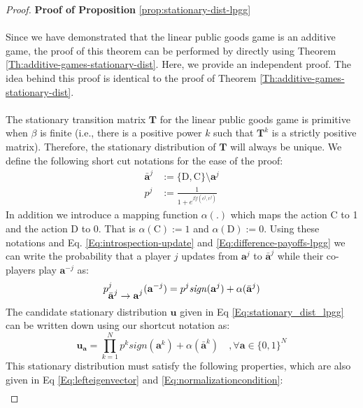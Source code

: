 \documentclass[11pt]{article}
\theoremstyle{plainCl1}
\theoremstyle{plainCl2}
\newcommand{\abf}{\mathbf{a}}
\newcommand{\T}{\mathbf{T}}
\newcommand{\ubf}{\mathbf{u}}
\newcommand{\C}{\mathrm{C}}
\newcommand{\D}{\mathrm{D}}
\begin{document}
\begin{proof}
\textbf{Proof of Proposition} \ref{prop:stationary-dist-lpgg} \\ \\
Since we have demonstrated that the linear public goods game is an additive game, the proof of this theorem can be performed by directly using Theorem \ref{Th:additive-games-stationary-dist}. Here, we provide an independent proof. The idea behind this proof is identical to the proof of Theorem \ref{Th:additive-games-stationary-dist}. \\ \\
\noindent The stationary transition matrix $\T$ for the linear public goods game is primitive when $\beta$ is finite (i.e., there is a positive power $k$ such that $\T^k$ is a strictly positive matrix). Therefore, the stationary distribution of $\T$ will always be unique. We define the following short cut notations for the ease of the proof: 
\begin{eqnarray}
\bar{\abf}^j &:= \{\D,\C\} \setminus \abf^j  \\ 
p^j &:= \frac{1}{1 + \displaystyle e^{\beta f(c^j, r^j)}} 
\end{eqnarray}
In addition we introduce a mapping function $\alpha(.)$ which maps the action $\C$ to 1 and the action $\D$ to 0. That is $\alpha(\C) := 1$ and $\alpha(\D) := 0$. Using these notations and Eq. \ref{Eq:introspection-update} and \ref{Eq:difference-payoffs-lpgg} we can write the probability that a player $j$ updates from $\abf^j$ to $\bar{\abf}^j$ while their co-players play $\abf^{-j}$ as: \\
\begin{equation}
p^j_{\displaystyle \bar{\abf}^j  \to \abf^j} (\abf^{-j}) = p^j \mathit{sign}(\abf^j) + \alpha(\bar{\abf}^j) \\ \\
\end{equation}
The candidate stationary distribution $\ubf$ given in Eq \ref{Eq:stationary_dist_lpgg} can be written down using our shortcut notation as: 
\begin{equation}
\label{Eq:stationary-dist-shortcut}
\ubf_\abf = \prod_{k = 1}^{N}  p^k \mathit{sign}(\abf^k) + \alpha(\bar{\abf}^k) \quad ,\forall \abf \in \{0,1\}^N
\end{equation}
This stationary distribution must satisfy the following properties, which are also given in Eq  \ref{Eq:lefteigenvector} and \ref{Eq:normalizationcondition}:
\begin{align}
\label{Eq:transition-in-proof}

\end{align}
\end{proof}
\end{document}
